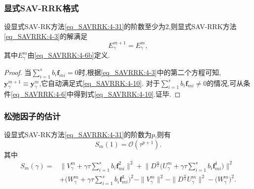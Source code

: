\documentclass[aspectratio=169]{beamer}
\numberwithin{theorem}{section} %
\numberwithin{equation}{section}%
\numberwithin{figure}{section}%
\numberwithin{table}{section}%
\begin{document}
\begin{frame}\frametitle{显式SAV-RRK格式}
	\begin{theorem}
		设显式SAV-RK方法\eqref{eq_SAVRRK:4-31}的阶数至少为2,则显式SAV-RRK方法\eqref{eq_SAVRRK:4-3}的解满足
		\begin{equation}
		E_{\gamma}^{m+1}=E_{\gamma}^{m}, \label{eq_SAVRRK:4-10}
		\end{equation}
		其中$E_{\gamma}^{m}$由\eqref{eq_SAVRRK:4-6b}定义.
		\end{theorem}
		
		\begin{proof}
		当$\sum\limits_{i=1}^s b_i \bm{f}_{m i}=0$时,根据\eqref{eq_SAVRRK:4-3}中的第二个方程可知, $\bm{y}_\gamma^{m+1}\equiv\bm{y}_\gamma^m$,它自动满足式\eqref{eq_SAVRRK:4-10}.
		对于$\sum\limits_{i=1}^s b_i \bm{f}_{m i}\neq 0$的情况,可从条件\eqref{eq_SAVRRK:4-6}中得到式\eqref{eq_SAVRRK:4-10}.证毕.
		\end{proof}
\end{frame}

\begin{frame}\frametitle{松弛因子的估计}
	\begin{lemma}\label{lem_SAVRRK:5_1}
	设显式SAV-RK方法\eqref{eq_SAVRRK:4-31}的阶数为$p$,则有
	\begin{equation}
	S_m(1)=\mathcal{O}(\tau^{p+1}).
	\end{equation}
	其中
	\begin{equation}
		\begin{aligned}\label{eq_SAVRRK:sm}
		S_m(\gamma)=&\big\|V_\gamma^m+\gamma \tau \sum\limits_{i=1}^s b_i \bm{f}_{m i}^2\big\|^2 + \big\|D^\frac{\alpha}{2} \big(U_\gamma^m+\gamma \tau \sum\limits_{i=1}^s b_i \bm{f}_{m i}^1\big)\big\|^2\\
		&+\big(W_\gamma^m+\gamma \tau \sum\limits_{i=1}^s b_i \bm{f}_{m i}^3\big)^2-\|V_\gamma^{m}\|^2 - \|D^\frac{\alpha}{2} U_\gamma^{m}\|^2-\big(W_\gamma^{m}\big)^2.
		\end{aligned}
		\end{equation}
	\end{lemma}
\end{frame}
\end{document}
